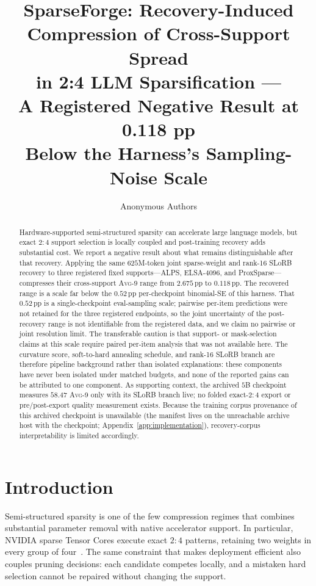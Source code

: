 \documentclass{article}
\title{SparseForge: Recovery-Induced\\ Compression of Cross-Support Spread\\ in 2:4 LLM Sparsification ---\\ A Registered Negative Result at 0.118 pp\\ Below the Harness's Sampling-Noise Scale}
\author{Anonymous Authors}
\newcommand{\taskavg}{\textsc{Avg}-9}
\begin{document}
\maketitle

\begin{abstract}
Hardware-supported semi-structured sparsity can accelerate large language models, but exact $2{:}4$ support selection is locally coupled and post-training recovery adds substantial cost. We report a negative result about what remains distinguishable after that recovery. Applying the same $625$M-token joint sparse-weight and rank-16 SLoRB recovery to three registered fixed supports---ALPS, ELSA-4096, and ProxSparse---compresses their cross-support \taskavg{} range from $2.675$\,pp to $0.118$\,pp. The recovered range is a scale far below the $0.52$\,pp per-checkpoint binomial-SE of this harness. That $0.52$\,pp is a single-checkpoint eval-sampling scale; pairwise per-item predictions were not retained for the three registered endpoints, so the joint uncertainty of the post-recovery range is not identifiable from the registered data, and we claim no pairwise or joint resolution limit. The transferable caution is that support- or mask-selection claims at this scale require paired per-item analysis that was not available here. The curvature score, soft-to-hard annealing schedule, and rank-16 SLoRB branch are therefore pipeline background rather than isolated explanations: these components have never been isolated under matched budgets, and none of the reported gains can be attributed to one component. As supporting context, the archived $5$B checkpoint measures $58.47$ \taskavg{} only with its SLoRB branch live; no folded exact-$2{:}4$ export or pre/post-export quality measurement exists. Because the training corpus provenance of this archived checkpoint is unavailable (the manifest lives on the unreachable archive host with the checkpoint; Appendix~\ref{app:implementation}), recovery-corpus interpretability is limited accordingly.
\end{abstract}

\section{Introduction}
Semi-structured sparsity is one of the few compression regimes that combines substantial parameter removal with native accelerator support. In particular, NVIDIA sparse Tensor Cores execute exact $2{:}4$ patterns, retaining two weights in every group of four~\citep{nvidia2020ampere}. The same constraint that makes deployment efficient also couples pruning decisions: each candidate competes locally, and a mistaken hard selection cannot be repaired without changing the support.
\end{document}

